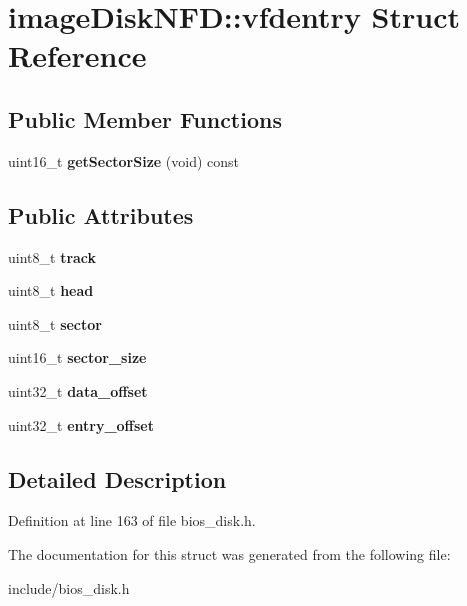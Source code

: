\hypertarget{structimageDiskNFD_1_1vfdentry}{\section{image\-Disk\-N\-F\-D\-:\-:vfdentry Struct Reference}
\label{structimageDiskNFD_1_1vfdentry}
}
\subsection*{Public Member Functions}
\begin{DoxyCompactItemize}
\item 
\hypertarget{structimageDiskNFD_1_1vfdentry_a12bf8e217dd12b933e9e508d3d1d2115}{uint16\-\_\-t {\bfseries get\-Sector\-Size} (void) const }\label{structimageDiskNFD_1_1vfdentry_a12bf8e217dd12b933e9e508d3d1d2115}

\end{DoxyCompactItemize}
\subsection*{Public Attributes}
\begin{DoxyCompactItemize}
\item 
\hypertarget{structimageDiskNFD_1_1vfdentry_aead7c9ba94160f13dcf012c7adf5b8ef}{uint8\-\_\-t {\bfseries track}}\label{structimageDiskNFD_1_1vfdentry_aead7c9ba94160f13dcf012c7adf5b8ef}

\item 
\hypertarget{structimageDiskNFD_1_1vfdentry_a132e27d1df33c47c37235e7958e3301d}{uint8\-\_\-t {\bfseries head}}\label{structimageDiskNFD_1_1vfdentry_a132e27d1df33c47c37235e7958e3301d}

\item 
\hypertarget{structimageDiskNFD_1_1vfdentry_affe7d792cd3b0d3cf2ec1578a0858541}{uint8\-\_\-t {\bfseries sector}}\label{structimageDiskNFD_1_1vfdentry_affe7d792cd3b0d3cf2ec1578a0858541}

\item 
\hypertarget{structimageDiskNFD_1_1vfdentry_a6e26dac70e9c36939eede2b5540e120a}{uint16\-\_\-t {\bfseries sector\-\_\-size}}\label{structimageDiskNFD_1_1vfdentry_a6e26dac70e9c36939eede2b5540e120a}

\item 
\hypertarget{structimageDiskNFD_1_1vfdentry_a47065ee2a3e3c590c6617e5855d054f8}{uint32\-\_\-t {\bfseries data\-\_\-offset}}\label{structimageDiskNFD_1_1vfdentry_a47065ee2a3e3c590c6617e5855d054f8}

\item 
\hypertarget{structimageDiskNFD_1_1vfdentry_a17429a540fce1558b87fcc735f56c88f}{uint32\-\_\-t {\bfseries entry\-\_\-offset}}\label{structimageDiskNFD_1_1vfdentry_a17429a540fce1558b87fcc735f56c88f}

\end{DoxyCompactItemize}


\subsection{Detailed Description}


Definition at line 163 of file bios\-\_\-disk.\-h.



The documentation for this struct was generated from the following file\-:\begin{DoxyCompactItemize}
\item 
include/bios\-\_\-disk.\-h\end{DoxyCompactItemize}
